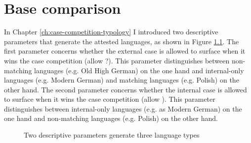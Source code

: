 
\chapter{Base comparison}\label{ch:relativization}

In Chapter \ref{ch:case-competition-typology} I introduced two descriptive parameters that generate the attested languages, as shown in Figure \ref{fig:two-parameters}.
The first parameter concerns whether the external case is allowed to surface when it wins the case competition (allow ?). This parameter distinguishes between non-matching languages (e.g. Old High German) on the one hand and internal-only languages (e.g. Modern German) and matching languages (e.g. Polish) on the other hand.
The second parameter concerns whether the internal case is allowed to surface when it wins the case competition (allow ). This parameter distinguishes between internal-only languages (e.g. as Modern German) on the one hand and non-matching languages (e.g. Polish) on the other hand.

\begin{figure}[H]
  \centering
    \footnotesize{
    }
    \caption{Two descriptive parameters generate three language types}
    \label{fig:two-parameters}
\end{figure}

